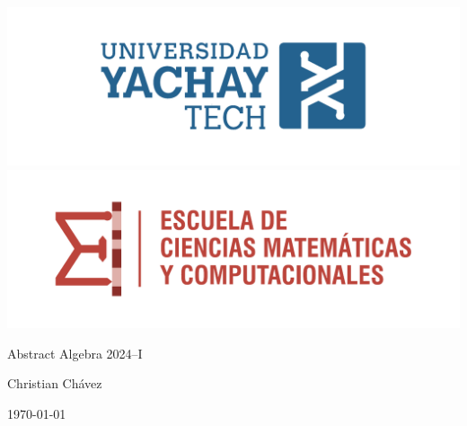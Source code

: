 \pagebreak

\begin{center}
    \includegraphics[height=0.075\textheight]{images/LogoYachay.pdf} 
    \hspace{0.1\linewidth}
    \includegraphics[height=0.075\textheight]{images/LogoECMC.pdf}
\end{center}


\begin{center}
    {\LARGE
    Abstract Algebra 2024--I\\
    \vspace{0.25cm}
    \textbf{\thetitle{}}}

    
    Christian Chávez
    
    \today

\end{center}

